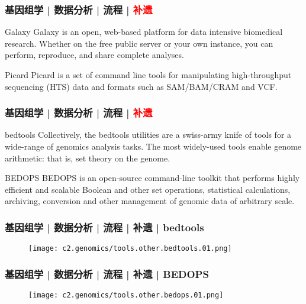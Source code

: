 \begin{frame}
  \frametitle{基因组学 | 数据分析 | 流程 | \textcolor{red}{补遗}}
  \begin{block}{Galaxy}
    Galaxy is an open, web-based platform for data intensive biomedical research. Whether on the free public server or your own instance, you can perform, reproduce, and share complete analyses.
  \end{block}
  \pause
  \begin{block}{Picard}
    Picard is a set of command line tools for manipulating high-throughput sequencing (HTS) data and formats such as SAM/BAM/CRAM and VCF.
  \end{block}
\end{frame}

\begin{frame}
  \frametitle{基因组学 | 数据分析 | 流程 | \textcolor{red}{补遗}}
  \begin{block}{bedtools}
    Collectively, the bedtools utilities are a swiss-army knife of tools for a wide-range of genomics analysis tasks. The most widely-used tools enable genome arithmetic: that is, set theory on the genome.
  \end{block}
  \pause
  \begin{block}{BEDOPS}
    BEDOPS is an open-source command-line toolkit that performs highly efficient and scalable Boolean and other set operations, statistical calculations, archiving, conversion and other management of genomic data of arbitrary scale.
  \end{block}
\end{frame}

\begin{frame}
  \frametitle{基因组学 | 数据分析 | 流程 | 补遗 | bedtools}
  \begin{figure}
    \centering
    \texttt{[image: c2.genomics/tools.other.bedtools.01.png]}
  \end{figure}
\end{frame}

\begin{frame}
  \frametitle{基因组学 | 数据分析 | 流程 | 补遗 | BEDOPS}
  \begin{figure}
    \centering
    \texttt{[image: c2.genomics/tools.other.bedops.01.png]}
  \end{figure}
\end{frame}

